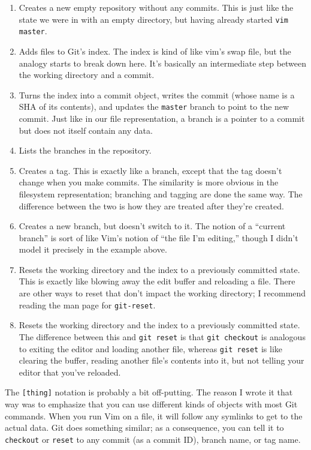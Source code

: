 \documentclass{article}
\begin{document}
\begin{enumerate}
\item[{\tt git init}]
  Creates a new empty repository without any commits. This is just like the state we were in with an empty directory, but having already started {\tt vim master}.

\item[{\tt git add [files]}]
  Adds files to Git's index. The index is kind of like vim's swap file, but the analogy starts to break down here. It's basically an intermediate step between the working directory and a
  commit.

\item[{\tt git commit}]
  Turns the index into a commit object, writes the commit (whose name is a SHA of its contents), and updates the {\tt master} branch to point to the new commit. Just like in our file
  representation, a branch is a pointer to a commit but does not itself contain any data.

\item[{\tt git branch}]
  Lists the branches in the repository.

\item[{\tt git tag [name]}]
  Creates a tag. This is exactly like a branch, except that the tag doesn't change when you make commits. The similarity is more obvious in the filesystem representation; branching and
  tagging are done the same way. The difference between the two is how they are treated after they're created.

\item[{\tt git branch [name]}]
  Creates a new branch, but doesn't switch to it. The notion of a ``current branch'' is sort of like Vim's notion of ``the file I'm editing,'' though I didn't model it precisely in the
  example above.

\item[{\tt git reset --hard [thing]}]
  Resets the working directory and the index to a previously committed state. This is exactly like blowing away the edit buffer and reloading a file. There are other ways to reset that
  don't impact the working directory; I recommend reading the man page for {\tt git-reset}.

\item[{\tt git checkout [thing]}]
  Resets the working directory and the index to a previously committed state. The difference between this and {\tt git reset} is that {\tt git checkout} is analogous to exiting the editor
  and loading another file, whereas {\tt git reset} is like clearing the buffer, reading another file's contents into it, but not telling your editor that you've reloaded.
\end{enumerate}

  The {\tt [thing]} notation is probably a bit off-putting. The reason I wrote it that way was to emphasize that you can use different kinds of objects with most Git commands. When you run Vim
  on a file, it will follow any symlinks to get to the actual data. Git does something similar; as a consequence, you can tell it to {\tt checkout} or {\tt reset} to any commit (as a commit
  ID), branch name, or tag name.
\end{document}
